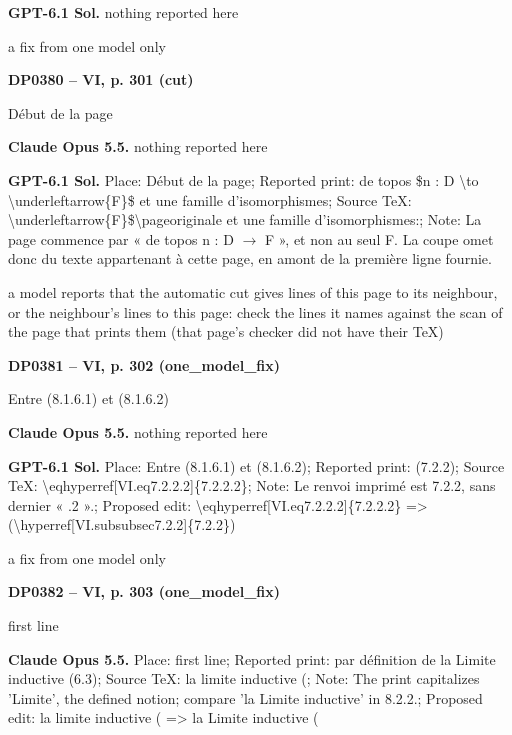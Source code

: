 \textbf{GPT-6.1 Sol.} nothing reported here\par
a fix from one model only\par
\par\noindent\hypertarget{DP0380}{}\textbf{DP0380 -- VI, p. 301 (cut)}\par
Début de la page\par
\textbf{Claude Opus 5.5.} nothing reported here\par
\textbf{GPT-6.1 Sol.} Place: Début de la page; Reported print: de topos \$n : D \textbackslash{}to \textbackslash{}underleftarrow\{F\}\$ et une famille d'isomorphismes; Source TeX: \textbackslash{}underleftarrow\{F\}\$\textbackslash{}pageoriginale et une famille d'isomorphismes:; Note: La page commence par « de topos n : D \ensuremath{\to} F », et non au seul F. La coupe omet donc du texte appartenant à cette page, en amont de la première ligne fournie.\par
a model reports that the automatic cut gives lines of this page to its neighbour, or the neighbour's lines to this page: check the lines it names against the scan of the page that prints them (that page's checker did not have their TeX)\par
\par\noindent\hypertarget{DP0381}{}\textbf{DP0381 -- VI, p. 302 (one\_model\_fix)}\par
Entre (8.1.6.1) et (8.1.6.2)\par
\textbf{Claude Opus 5.5.} nothing reported here\par
\textbf{GPT-6.1 Sol.} Place: Entre (8.1.6.1) et (8.1.6.2); Reported print: (7.2.2); Source TeX: \textbackslash{}eqhyperref[VI.eq7.2.2.2]\{7.2.2.2\}; Note: Le renvoi imprimé est 7.2.2, sans dernier « .2 ».; Proposed edit: \textbackslash{}eqhyperref[VI.eq7.2.2.2]\{7.2.2.2\} =\allowbreak > (\textbackslash{}hyperref[VI.subsubsec7.2.2]\{7.2.2\})\par
a fix from one model only\par
\par\noindent\hypertarget{DP0382}{}\textbf{DP0382 -- VI, p. 303 (one\_model\_fix)}\par
first line\par
\textbf{Claude Opus 5.5.} Place: first line; Reported print: par définition de la Limite inductive (6.3); Source TeX: la limite inductive (; Note: The print capitalizes 'Limite', the defined notion; compare 'la Limite inductive' in 8.2.2.; Proposed edit: la limite inductive ( =\allowbreak > la Limite inductive (\par
